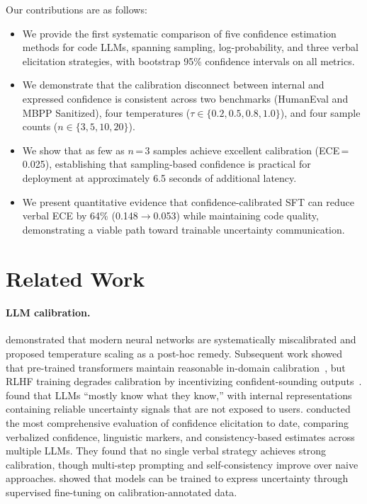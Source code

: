 \documentclass{article}
\begin{document}
Our contributions are as follows:
\begin{itemize}
  \item We provide the first systematic comparison of five confidence estimation methods for code LLMs, spanning sampling, log-probability, and three verbal elicitation strategies, with bootstrap 95\% confidence intervals on all metrics.
  \item We demonstrate that the calibration disconnect between internal and expressed confidence is consistent across two benchmarks (HumanEval and MBPP Sanitized), four temperatures ($\tau \in \{0.2, 0.5, 0.8, 1.0\}$), and four sample counts ($n \in \{3, 5, 10, 20\}$).
  \item We show that as few as $n$\,=\,3 samples achieve excellent calibration (ECE\,=\,0.025), establishing that sampling-based confidence is practical for deployment at approximately 6.5 seconds of additional latency.
  \item We present quantitative evidence that confidence-calibrated SFT can reduce verbal ECE by 64\% (0.148$\rightarrow$0.053) while maintaining code quality, demonstrating a viable path toward trainable uncertainty communication.
\end{itemize}

\section{Related Work}
\label{sec:related}

\paragraph{LLM calibration.}
\citet{guo2017calibration} demonstrated that modern neural networks are systematically miscalibrated and proposed temperature scaling as a post-hoc remedy. Subsequent work showed that pre-trained transformers maintain reasonable in-domain calibration~\citep{desai2020calibration}, but RLHF training degrades calibration by incentivizing confident-sounding outputs~\citep{tian2023just}. \citet{kadavath2022language} found that LLMs ``mostly know what they know,'' with internal representations containing reliable uncertainty signals that are not exposed to users. \citet{xiong2024can} conducted the most comprehensive evaluation of confidence elicitation to date, comparing verbalized confidence, linguistic markers, and consistency-based estimates across multiple LLMs. They found that no single verbal strategy achieves strong calibration, though multi-step prompting and self-consistency improve over naive approaches. \citet{lin2022teaching} showed that models can be trained to express uncertainty through supervised fine-tuning on calibration-annotated data.
\end{document}
